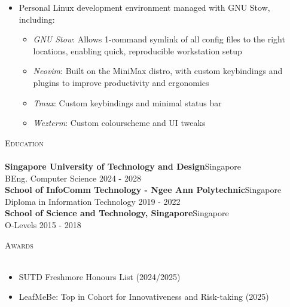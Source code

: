 \documentclass[a4paper]{article}
\newcommand{\lineunder} {
    \vspace*{-8pt} \\
    \hspace*{-18pt} \hrulefill \\
}
\newcommand{\header} [1] {
    {\hspace*{-18pt}\vspace*{6pt} \textsc{#1}}
    \vspace*{-6pt} \lineunder
}
\begin{document}
\vspace{-1mm}
\begin{itemize} \itemsep 0.5pt
\item Personal Linux development environment managed with GNU Stow, including:
\vspace{-2mm}
  \begin{itemize} \itemsep 0.2pt
      \item \textit{GNU Stow}: Allows 1-command symlink of all config files to the right locations, enabling quick, reproducible workstation setup
      \item \textit{Neovim}: Built on the MiniMax distro, with custom keybindings and plugins to improve productivity and ergonomics
      \item \textit{Tmux}: Custom keybindings and minimal status bar
      \item \textit{Wezterm}: Custom colourscheme and UI tweaks
  \end{itemize}
\end{itemize}
\vspace*{2mm}

\header{Education}
\vspace{1mm}
\textbf{Singapore University of Technology and Design}\hfill Singapore\\
BEng. Computer Science \hfill 2024 - 2028\\
\vspace{2mm}
\textbf{School of InfoComm Technology - Ngee Ann Polytechnic}\hfill Singapore\\
Diploma in Information Technology \hfill 2019 - 2022\\
\vspace{2mm}
\textbf{School of Science and Technology, Singapore}\hfill Singapore\\
O-Levels \hfill 2015 - 2018\\
\vspace{4mm}

\header{Awards}
\vspace{1mm}
\begin{itemize} \itemsep 0.5pt
    \item SUTD Freshmore Honours List (2024/2025)
    \item LeafMeBe: Top in Cohort for Innovativeness and Risk-taking (2025)
\end{itemize}
\vspace*{2mm}

\
\end{document}
